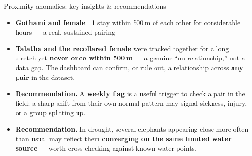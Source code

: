 \documentclass{beamer}
\newcommand{\hi}[1]{\textbf{\textcolor{hicolor}{#1}}}
\begin{document}
	
	
	
	
	
	
	\begin{frame}{Proximity anomalies: key insights \& recommendations}
		\small
		\setlength{\itemsep}{6pt}
		\begin{itemize}
			\item \hi{Gothami and female\_1} stay within 500\,m of each other for
			considerable hours --- a real, sustained pairing.
			\item \hi{Talatha and the recollared female} were tracked together for a long
			stretch yet \hi{never once within 500\,m} --- a genuine ``no relationship,''
			not a data gap. The dashboard can confirm, or rule out, a relationship across
			\hi{any pair} in the dataset.
			\item \textbf{Recommendation.} A \hi{weekly flag} is a useful trigger to check
			a pair in the field: a sharp shift from their own normal pattern may signal
			sickness, injury, or a group splitting up.
			\item \textbf{Recommendation.} In drought, several elephants appearing close
			more often than usual may reflect them \hi{converging on the same limited
				water source} --- worth cross-checking against known water points.
		\end{itemize}
	\end{frame}
	
	
	
	
	
\end{document}
